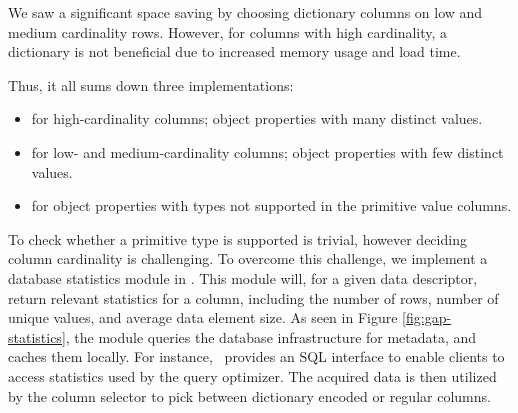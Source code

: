 We saw a significant space saving by choosing dictionary columns on low and medium cardinality rows. However, for columns with high cardinality, a dictionary is not beneficial due to increased memory usage and load time.

Thus, it all sums down three implementations:
\begin{itemize}
    \item {} for high-cardinality columns; object properties with many distinct values.
    \item {} for low- and medium-cardinality columns; object properties with few distinct values.
    \item {} for object properties with types not supported in the primitive value columns.
\end{itemize}


To check whether a primitive type is supported is trivial, however deciding column cardinality is challenging. To overcome this challenge, we implement a database statistics module in \gap. This module will, for a given data descriptor, return relevant statistics for a column, including the number of rows, number of unique values, and average data element size. As seen in Figure \ref{fig:gap-statistics}, the module queries the database infrastructure for metadata, and caches them locally. For instance, \oracle~provides an SQL interface to enable clients to access statistics used by the query optimizer. The acquired data is then utilized by the column selector to pick between dictionary encoded or regular columns.

%


